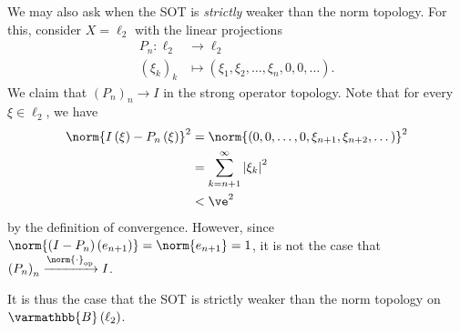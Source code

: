 \documentclass[10pt]{mypackage}
\renewcommand*{\mathbb}[1]{\varmathbb{#1}}
\newcommand{\B}{\mathbb{B}}
\begin{document}
\begin{example}
  We may also ask when the SOT is \textit{strictly} weaker than the norm topology. For this, consider $X = \ell_2$ with the linear projections
  \begin{align*}
    P_n: \ell_2 &\rightarrow \ell_2\\
    \left(\xi_k\right)_k &\mapsto \left(\xi_1,\xi_2,\dots,\xi_n,0,0,\dots\right).
  \end{align*}
  We claim that $\left(P_n\right)_n\rightarrow I$ in the strong operator topology. Note that for every $\xi\in \ell_2$, we have
  \begin{align*}
    \norm{I\left(\xi\right) - P_n\left(\xi\right)}^2 &= \norm{\left(0,0,\dots,0,\xi_{n+1},\xi_{n+2},\dots\right)}^2\\
                                                     &= \sum_{k = n+1}^{\infty}\left\vert \xi_k \right\vert^2\\
                                                     & < \ve^2
  \end{align*}
  by the definition of convergence. However, since $\norm{\left(I-P_n\right)\left(e_{n+1}\right)} = \norm{e_{n+1}} = 1$, it is not the case that $\left(P_n\right)_n\xrightarrow{\norm{\cdot}_{\text{op}}}I$.\newline

  It is thus the case that the SOT is strictly weaker than the norm topology on $\B\left(\ell_2\right)$.
\end{example}
\end{document}
